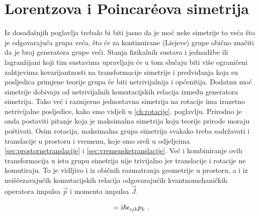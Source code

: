 
\chapter{Lorentzova i Poincar\'{e}ova simetrija}

Iz dosadašnjih poglavlja trebalo bi biti jasno da je moć
neke simetrije to veća što je odgovarajuća grupa veća, što
će za kontinuirane (Liejeve) grupe obično značiti da je broj generatora
grupe veći. Stanja fizikalnih sustava i jednadžbe ili lagranžijani
koji tim sustavima upravljaju
će u tom slučaju biti više ograničeni zahtjevima kovarijantnosti
na transformacije simetrije i predviđanja koja su posljedica
primjene teorije grupa će biti netrivijalnija i općenitija.
Dodatnu moć simetrije dobivaju od netrivijalnih komutacijskih
relacija između generatora simetrija.
Tako već i razmjerno jednostavna simetrija na rotacije ima izuzetno
netrivijalne posljedice, kako smo vidjeli u \ref{ch:rotacije}. poglavlju.
Prirodno je onda postaviti pitanje koja je maksimalna
simetrija koju teorije prirode moraju poštivati. Osim rotacija,
maksimalna grupa simetrija svakako treba sadržavati i translacije
u prostoru i vremenu, koje smo sreli u odjeljcima
\ref{sec:prostornetranslacije} i \ref{sec:vremensketranslacije}.
Već i kombiniranje ovih transformacija u istu grupu simetrija
nije trivijalno jer translacije i rotacije ne komutiraju. To je
vidljivo i iz običnih razmatranja geometrije u prostoru, a i iz 
neiščezavajućih komutacijskih relacija odgovarajućih
kvantnomehaničkih operatora impulsa $\vec{p}$ i momenta
impulsa $\vec{J}$.

\begin{equation}
    [J_{i}, p_{j}] = \rmi \hbar \epsilon_{ijk} p_{k} \;.
    \label{eq:jpkomutacijske}
\end{equation}

